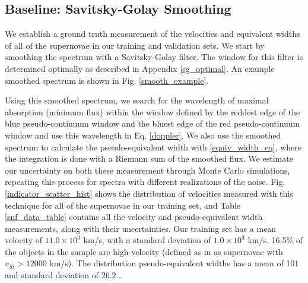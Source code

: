 \subsection{Baseline: Savitsky-Golay Smoothing}
We establish a ground truth measurement of the velocities and equivalent widths of all of the supernovae in our training and validation sets. We start by smoothing the spectrum with a Savitsky-Golay filter. The window for this filter is determined optimally as described in Appendix \ref{sg_optimal}. An example smoothed spectrum is shown in Fig. \ref{smooth_example}.

Using this smoothed spectrum, we search for the wavelength of maximal absorption (minimum flux) within the window defined by the reddest edge of the blue pseudo-continuum window and the bluest edge of the red pseudo-continuum window and use this wavelength in Eq. \ref{doppler}. We also use the smoothed spectrum to calculate the pseudo-equivalent width with \ref{equiv_width_eq}, where the integration is done with a Riemann sum of the smoothed flux. We estimate our uncertainty on both these measurement through Monte Carlo simulations, repeating this process for spectra with different realizations of the noise. Fig. \ref{indicator_scatter_hist} shows the distribution of velocities measured with this technique for all of the supernovae in our training set, and Table \ref{snf_data_table} contains all the velocity and pseudo-equivalent width measurements, along with their uncertainties. Our training set has a mean velocity of $11.0 \times 10^3$ km/s, with a standard deviation of $1.0 \times 10^3$ km/s. 16.5\% of the objects in the sample are high-velocity (defined as in \parencite{wang_evidence_2013} as supernovae with $v_{Si}>12000$ km/s). The distribution pseudo-equivalent widths has a mean of 101 \angstrom\; and standard deviation of 26.2 \angstrom.

